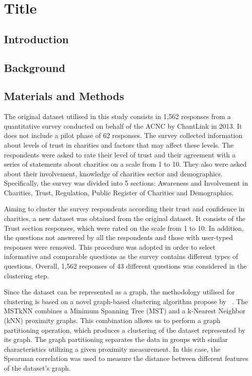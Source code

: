 \documentclass{article}
\begin{document}



\section{Title}

\subsection{Introduction}

\subsection{Background}

\subsection{Materials and Methods}


The original dataset utilised in this study consists in 1,562 responses from a
quantitative survey conducted on behalf of the ACNC by ChantLink in 2013. It
does not include a pilot phase of 62 responses. The survey collected information
about levels of trust in charities and factors that may affect these levels. The
respondents were asked to rate their level of trust and their agreement with a
series of statements about charities on a scale from 1 to 10. They also were
asked about their involvement, knowledge of charities sector and demographics.
Specifically, the survey was divided into 5 sections: Awareness and Involvement
in Charities, Trust, Regulation, Public Register of Charities and Demographics.

Aiming to cluster the survey respondents according their trust and confidence in
charities, a new dataset was obtained from the original dataset. It consists of
the Trust section responses, which were rated on the scale from 1 to 10. In
addition, the questions not answered by all the respondents and those with
user-typed responses were removed. This procedure was adopted in order to select
informative and comparable questions as the survey contains different types of
questions. Overall, 1,562 responses of 43 different questions was considered in
the clustering step.

Since the dataset can be represented as a graph, the methodology utilised for
clustering is based on a novel graph-based clustering algorithm propose by
~\cite{Inostroza2008}. The MSTkNN combines a Minimum Spanning Tree (MST) and a
k-Nearest Neighbor (kNN) proximity graphs. This combination allows us to perform
a graph partitioning operation, which produces a clustering of the dataset
represented by its graph. The graph partitioning separates the data in groups
with similar characteristics utilizing a given proximity measurement. In this
case, the Spearman correlation was used to measure the distance between
different features of the dataset's graph.
\end{document}
